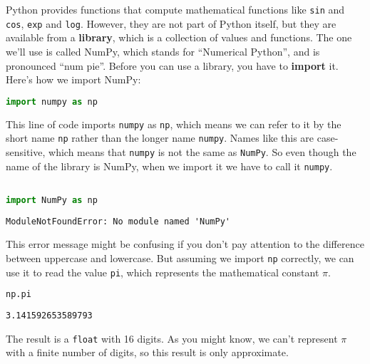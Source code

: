 \documentclass[
]{book}
\newcommand{\passthrough}[1]{#1}
\begin{document}
Python provides functions that compute mathematical functions like
\passthrough{\lstinline!sin!} and \passthrough{\lstinline!cos!},
\passthrough{\lstinline!exp!} and \passthrough{\lstinline!log!}.
However, they are not part of Python itself, but they are available from
a \textbf{library}, which is a collection of values and functions. The
one we'll use is called NumPy, which stands for ``Numerical Python'',
and is pronounced ``num pie''. Before you can use a library, you have to
\textbf{import} it. Here's how we import NumPy:

\begin{lstlisting}[language=Python]
import numpy as np
\end{lstlisting}

This line of code imports \passthrough{\lstinline!numpy!} as
\passthrough{\lstinline!np!}, which means we can refer to it by the
short name \passthrough{\lstinline!np!} rather than the longer name
\passthrough{\lstinline!numpy!}. Names like this are case-sensitive,
which means that \passthrough{\lstinline!numpy!} is not the same as
\passthrough{\lstinline!NumPy!}. So even though the name of the library
is NumPy, when we import it we have to call it
\passthrough{\lstinline!numpy!}.

\begin{lstlisting}[language=Python]
%%expect ModuleNotFoundError

import NumPy as np
\end{lstlisting}

\begin{lstlisting}
ModuleNotFoundError: No module named 'NumPy'
\end{lstlisting}

This error message might be confusing if you don't pay attention to the
difference between uppercase and lowercase. But assuming we import
\passthrough{\lstinline!np!} correctly, we can use it to read the value
\passthrough{\lstinline!pi!}, which represents the mathematical constant
\(\pi\).

\begin{lstlisting}[language=Python]
np.pi
\end{lstlisting}

\begin{lstlisting}
3.141592653589793
\end{lstlisting}

The result is a \passthrough{\lstinline!float!} with 16 digits. As you
might know, we can't represent \(\pi\) with a finite number of digits,
so this result is only approximate.
\end{document}

